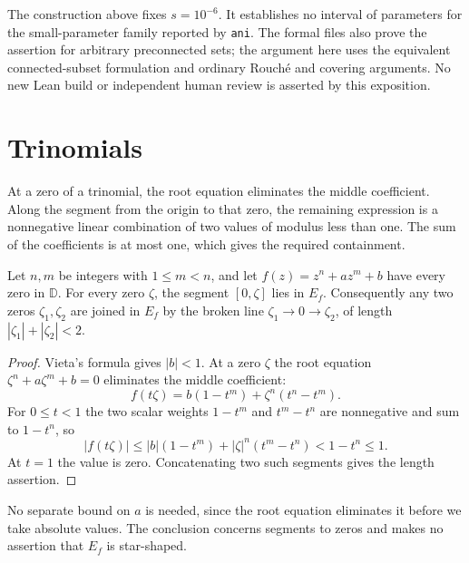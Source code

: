 \documentclass[11pt]{article}
\newcommand{\dbar}{\mathbb{D}}
\begin{document}
The construction above fixes $s=10^{-6}$. It establishes no interval of
parameters for the small-parameter family reported by \texttt{ani}.
The formal files also prove the assertion for arbitrary preconnected sets;
the argument here uses the equivalent connected-subset formulation and
ordinary Rouch\'e and covering arguments. No new Lean build or independent
human review is asserted by this exposition.

\section{Trinomials}
\label{sec:trinomials}

At a zero of a trinomial, the root equation eliminates the middle
coefficient. Along the segment from the origin to that zero, the
remaining expression is a nonnegative linear combination of two values
of modulus less than one. The sum of the coefficients is at most one,
which gives the required containment.

\begin{theorem}
\label{res:trinomial-all-degree}
Let $n,m$ be integers with $1\le m<n$, and let $f(z)=z^n+az^m+b$ have every
zero in $\dbar$.  For every zero $\zeta$, the segment $[0,\zeta]$ lies in
$E_f$.  Consequently any two zeros $\zeta_1,\zeta_2$ are joined in $E_f$ by
the broken line $\zeta_1\to0\to\zeta_2$, of length $|\zeta_1|+|\zeta_2|<2$.
\end{theorem}

\begin{proof}
Vieta's formula gives $|b|<1$.  At a zero $\zeta$ the root equation
$\zeta^n+a\zeta^m+b=0$ eliminates the middle coefficient:
\begin{equation}\label{eq:trinomial-cancellation}
 f(t\zeta)=b(1-t^m)+\zeta^n(t^n-t^m).
\end{equation}
For $0\le t<1$ the two scalar weights $1-t^m$ and $t^m-t^n$ are nonnegative
and sum to $1-t^n$, so
\[
 |f(t\zeta)|\le|b|(1-t^m)+|\zeta|^n(t^m-t^n)<1-t^n\le1 .
\]
At $t=1$ the value is zero.  Concatenating two such segments gives the length
assertion.
\end{proof}

No separate bound on $a$ is needed, since the root equation eliminates
it before we take absolute values.  The conclusion concerns segments to zeros and
makes no assertion that $E_f$ is star-shaped.
\end{document}
